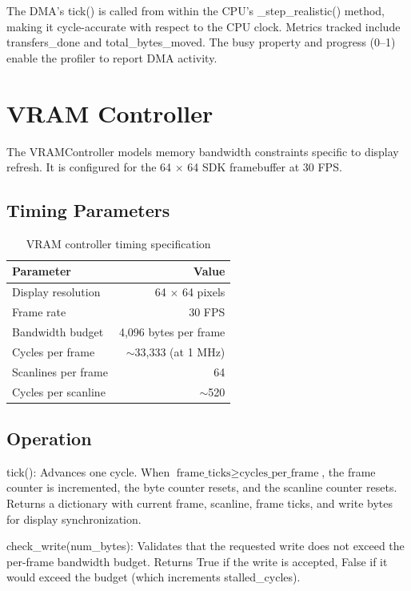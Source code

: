 \documentclass[12pt,a4paper,twoside]{book}
\theoremstyle{trinarytheorem}
\theoremstyle{trinarydefinition}
\newcommand{\code}[1]{\textsf{#1}}
\begin{document}
The DMA's \code{tick()} is called from within the CPU's
\code{\_step\_realistic()} method, making it cycle-accurate with respect
to the CPU clock. Metrics tracked include \code{transfers\_done} and
\code{total\_bytes\_moved}. The \code{busy} property and
\code{progress} (0--1) enable the profiler to report DMA activity.

\section{VRAM Controller}

The \code{VRAMController} models memory bandwidth constraints specific to
display refresh. It is configured for the 64 $\times$ 64 SDK framebuffer at
30 FPS.

\subsection{Timing Parameters}

\begin{table}[H]
\centering
\caption{VRAM controller timing specification}
\label{tab:vramparams}
\begin{tabular}{lr}
\toprule
Parameter & Value \\
\midrule
Display resolution & 64 $\times$ 64 pixels \\
Frame rate & 30 FPS \\
Bandwidth budget & 4,096 bytes per frame \\
Cycles per frame & $\sim$33,333 (at 1 MHz) \\
Scanlines per frame & 64 \\
Cycles per scanline & $\sim$520 \\
\bottomrule
\end{tabular}
\end{table}

\subsection{Operation}

\noindent\code{tick()}: Advances one cycle. When
$\text{frame\_ticks} \ge \text{cycles\_per\_frame}$, the frame counter is
incremented, the byte counter resets, and the scanline counter resets.
Returns a dictionary with current frame, scanline, frame ticks, and write
bytes for display synchronization.

\noindent\code{check\_write(num\_bytes)}: Validates that the requested
write does not exceed the per-frame bandwidth budget. Returns \code{True}
if the write is accepted, \code{False} if it would exceed the budget
(which increments \code{stalled\_cycles}).
\end{document}
